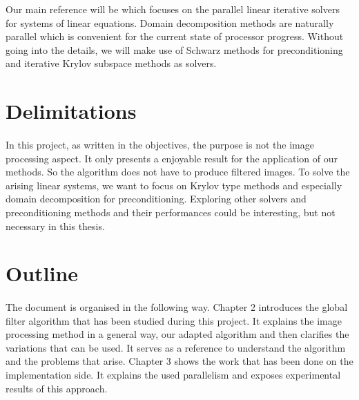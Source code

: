 Our main reference will be \cite{dolean_domain_2015} which focuses on the parallel linear iterative solvers for systems of linear equations.
Domain decomposition methods are naturally parallel which is convenient for the current state of processor progress.
Without going into the details, we will make use of Schwarz methods for preconditioning and iterative Krylov subspace methods as solvers.

\section{Delimitations}

\paragraph{}
In this project, as written in the objectives, the purpose is not the image processing aspect.
It only presents a enjoyable result for the application of our methods.
So the algorithm does not have to produce filtered images.
To solve the arising linear systems, we want to focus on Krylov type methods and especially domain decomposition for preconditioning.
Exploring other solvers and preconditioning methods and their performances could be interesting, but not necessary in this thesis.

\section{Outline}

\paragraph{}
The document is organised in the following way.
Chapter 2 introduces the global filter algorithm that has been studied during this project.
It explains the image processing method in a general way, our adapted algorithm and then clarifies the variations that can be used.
It serves as a reference to understand the algorithm and the problems that arise.
Chapter 3 shows the work that has been done on the implementation side.
It explains the used parallelism and exposes experimental results of this approach.
